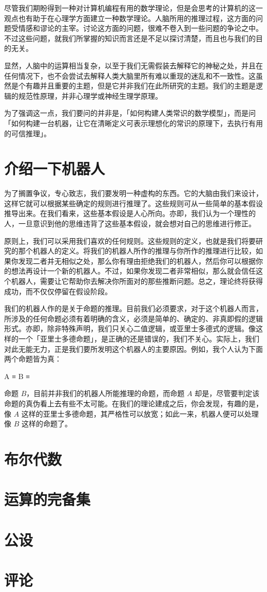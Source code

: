 尽管我们期盼得到一种对计算机编程有用的数学理论，但是会思考的计算机的这一观点也有助于在心理学方面建立一种数学理论。人脑所用的推理过程，这方面的问题受情感和谬论的主宰。讨论这方面的问题，很难不卷入到一些问题的争论之中。不过这些问题，就我们所掌握的知识而言还是不足以探讨清楚，而且也与我们的目的无关。

显然，人脑中的运算相当复杂，以至于我们无需假装去解释它的神秘之处，并且在任何情况下，也不会尝试去解释人类大脑里所有难以重现的迷乱和不一致性。这虽然是个有趣并且重要的主题，但是它并非我们在此所研究的主题。我们的主题是逻辑的规范性原理，并非心理学或神经生理学原理。

为了强调这一点，我们要问的并非是，「如何构建人类常识的数学模型」，而是问「如何构建一台机器，让它在清晰定义可表示理想化的常识的原理下，去执行有用的可信推理」。

\section{介绍一下机器人}

为了搁置争议，专心致志，我们要发明一种虚构的东西。它的大脑由我们来设计，这样它就可以根据某些确定的规则进行推理了。这些规则可从一些简单的基本假设推导出来。在我们看来，这些基本假设是人心所向。亦即，我们认为一个理性的人，一旦意识到他的思维违背了这些基本假设，就会想对自己的思维进行修正。

原则上，我们可以采用我们喜欢的任何规则。这些规则的定义，也就是我们将要研究的那个机器人的定义。将我们的机器人所作的推理与你所作的推理进行比较，如果你发现二者并无相似之处，那么你有理由拒绝我们的机器人，然后你可以根据你的想法再设计一个新的机器人。不过，如果你发现二者非常相似，那么就会信任这个机器人，需要让它帮助你去解决你所面对的那些推断问题。总之，理论终将获得成功，而不仅仅停留在假设阶段。

我们的机器人作的是关于命题的推理。目前我们必须要求，对于这个机器人而言，所涉及的任何命题必须有着明确的含义，必须是简单的、确定的、非真即假的逻辑形式。亦即，除非特殊声明，我们只关心二值逻辑，或亚里士多德式的逻辑。像这样的一个「亚里士多德命题」，是正确的还是错误的，我们不关心。实际上，我们对此无能无力，正是我们要所发明这个机器人的主要原因。例如，我个人认为下面两个命题皆为真：


\startformula
\startalign
\NC A \NC ≡ \NR
\NC B \NC ≡ \NR
\stopalign
\stopformula

命题 $B$，目前并非我们的机器人所能推理的命题，而命题 $A$ 却是，尽管要判定该命题的真伪看上去有些不太可能。在我们的理论建成之后，你会发现，有趣的是，像 $A$ 这样的亚里士多德命题，其严格性可以放宽；如此一来，机器人便可以处理像 $B$ 这样的命题了。

\section{布尔代数}

\section{运算的完备集}

\section{公设}

\section{评论}